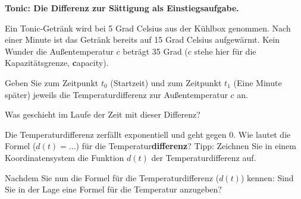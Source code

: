 \newpage



\bbwActAufgabenNr{} \textbf{Tonic: Die Differenz zur Sättigung als Einstiegsaufgabe.}

Ein Tonic-Getränk wird bei 5 Grad Celsius aus der Kühlbox genommen.
Nach einer Minute ist das Getränk bereits auf 15 Grad Celsius
aufgewärmt.
Kein Wunder die Außentemperatur $c$ beträgt 35 Grad ($c$ stehe hier
für die Kapazitätsgrenze, \textbf{c}apacity). 

\begin{bbwAufgabenBlock}

\item Geben Sie zum Zeitpunkt $t_0$ (Startzeit) und zum Zeitpunkt
  $t_1$ (Eine Minute später) jeweils die Temperaturdifferenz zur
  Außentemperatur $c$ an.


\item Was geschieht im Laufe der Zeit mit dieser Differenz?


\item Die Temperaturdifferenz zerfällt exponentiell und geht gegen 0.
  Wie lautet die Formel ($d(t)=...$) für die Temperatur\textbf{differenz}? Tipp:
  Zeichnen Sie in einem Koordinatensystem die Funktion $d(t)$ der
  Temperaturdifferenz auf.


\item Nachdem Sie nun die Formel für die Temperaturdifferenz ($d(t)$) kennen:
  Sind Sie in der Lage eine Formel für die Temperatur anzugeben?

  

\end{bbwAufgabenBlock}


\platzFuerBerechnungenBisEndeSeite{}

